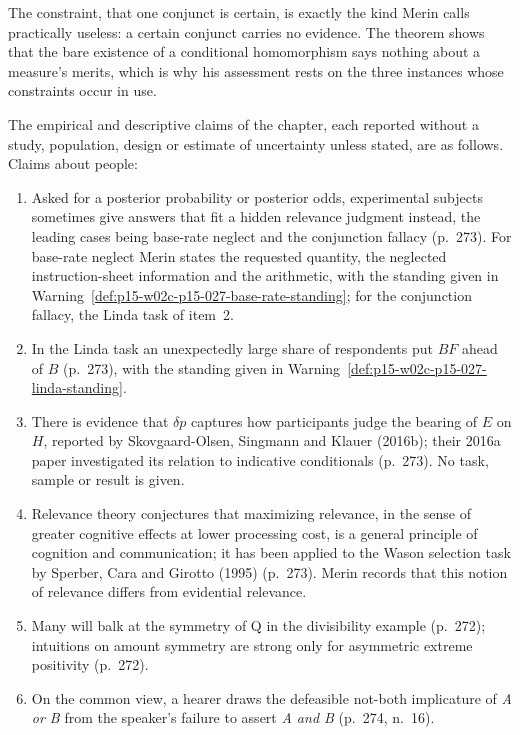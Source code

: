 The constraint, that one conjunct is certain, is exactly the kind Merin
calls practically useless: a certain conjunct carries no evidence. The
theorem shows that the bare existence of a conditional homomorphism says
nothing about a measure's merits, which is why his assessment rests on
the three instances whose constraints occur in use.

The empirical and descriptive claims of the chapter, each reported
without a study, population, design or estimate of uncertainty unless
stated, are as follows. Claims about people:
\begin{enumerate}
\item Asked for a posterior probability or posterior odds, experimental
  subjects sometimes give answers that fit a hidden relevance judgment
  instead, the leading cases being base-rate neglect and the conjunction
  fallacy (p.~273). For base-rate neglect Merin states the requested
  quantity, the neglected instruction-sheet information and the
  arithmetic, with the standing given in
  Warning~\ref{def:p15-w02c-p15-027-base-rate-standing}; for the
  conjunction fallacy, the Linda task of item~2.
\item In the Linda task an unexpectedly large share of respondents put
  \(BF\) ahead of \(B\) (p.~273), with the standing given in
  Warning~\ref{def:p15-w02c-p15-027-linda-standing}.
\item There is evidence that \(\delta p\) captures how participants
  judge the bearing of \(E\) on \(H\), reported by
  Skovgaard-Olsen, Singmann and Klauer (2016b); their 2016a paper
  investigated its relation to indicative conditionals (p.~273). No
  task, sample or result is given.
\item Relevance theory conjectures that maximizing relevance, in the
  sense of greater cognitive effects at lower processing cost, is a
  general principle of cognition and communication; it has been applied
  to the Wason selection task by Sperber, Cara and Girotto (1995)
  (p.~273). Merin records that this notion of relevance differs from
  evidential relevance.
\item Many will balk at the symmetry of Q in the divisibility example
  (p.~272); intuitions on amount symmetry are strong only for
  asymmetric extreme positivity (p.~272).
\item On the common view, a hearer draws the defeasible not-both
  implicature of \emph{A or B} from the speaker's failure to assert
  \emph{A and B} (p.~274, n.~16).
\end{enumerate}
